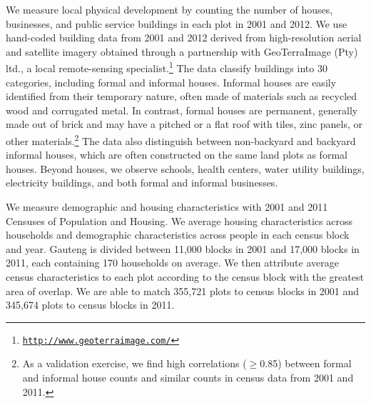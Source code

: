 \documentclass[12pt]{article}
\begin{document}
We measure local physical development by counting the number of houses, businesses, and public service buildings in each plot in 2001 and 2012.  We use hand-coded building data from 2001 and 2012 derived from high-resolution aerial and satellite imagery obtained through a partnership with GeoTerraImage (Pty) ltd., a local remote-sensing specialist.\footnote{\href{http://www.geoterraimage.com/}{\tt http://www.geoterraimage.com/}} The data classify buildings into 30 categories, including formal and informal houses. Informal houses are easily identified from their temporary nature, often made of materials such as recycled wood and corrugated metal. In contrast, formal houses are permanent, generally made out of brick and may have a pitched or a flat roof with tiles, zinc panels, or other materials.\footnote{As a validation exercise, we find high correlations ($\geq$0.85) between formal and informal house counts and similar counts in census data from 2001 and 2011.}  The data also distinguish between non-backyard and backyard informal houses, which are often constructed on the same land plots as formal houses.  Beyond houses, we observe schools, health centers, water utility buildings, electricity buildings, and both formal and informal businesses.  



We measure demographic and housing characteristics with 2001 and 2011 Censuses of Population and Housing.  We average housing characteristics across households and demographic characteristics across people in each census block and year.  Gauteng is divided between 11,000 blocks in 2001 and 17,000 blocks in 2011, each containing 170 households on average.  We then attribute average census characteristics to each plot according to the census block with the greatest area of overlap.  We are able to match 355,721 plots to census blocks in 2001 and 345,674 plots to census blocks in 2011.
\end{document}
